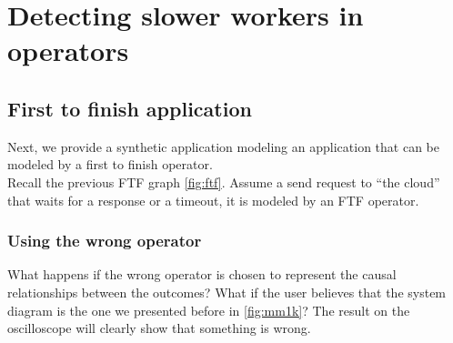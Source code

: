 \section{Detecting slower workers in operators}
    \subsection{First to finish application}
        Next, we provide a synthetic application modeling an application that can be modeled by a first to finish operator. \\
        Recall the previous FTF graph \cref{fig:ftf}. Assume a send request to ``the cloud'' that waits for a response or a timeout, it is modeled by an FTF operator. \cite{dq-tut}
       \subsubsection{Using the wrong operator}
            What happens if the wrong operator is chosen to represent the causal relationships between the outcomes? What if the user believes that the system diagram is the one we presented before in \cref{fig:mm1k}? The result on the oscilloscope will clearly show that something is wrong.

